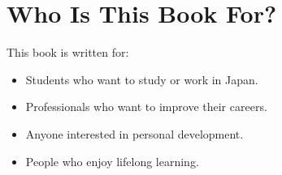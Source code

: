 \section{Who Is This Book For?}

This book is written for:

\begin{itemize}
    \item Students who want to study or work in Japan.
    \item Professionals who want to improve their careers.
    \item Anyone interested in personal development.
    \item People who enjoy lifelong learning.
\end{itemize}